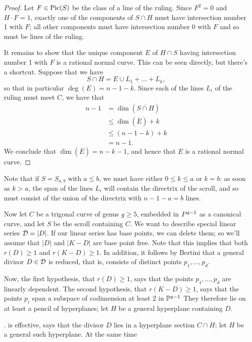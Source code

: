 \begin{proof}
Let $F \in \Pic(S)$ be the class of a line of the ruling. Since $F^2 = 0$ and $H\cdot F = 1$, exactly one of the components of $S \cap H$ must have intersection number 1 with $F$; all other components must have intersection number 0 with $F$ and so must be lines of the ruling.

It remains to show that the unique component $E$ of $H \cap S$ having intersection number 1 with $F$ is a rational normal curve. This can be seen directly, but there's a shortcut. Suppose that we have
$$
S \cap H = E \cup L_1 + \dots + L_k,
$$
so that in particular $\deg(E) = n-1-k$. Since each of the lines $L_i$ of the ruling must meet $C$, we have that
\begin{align*}
n-1 &= \dim(\overline{S \cap H}) \\
&\leq \dim(\overline {E}) + k\\
&\leq (n-1-k) + k \\
&= n-1.
\end{align*}
We conclude that $\dim(\overline E) = n-k-1$, and hence that $E$ is a rational normal curve.
\end{proof}

Note that if $S = S_{a,b}$ with $a \leq b$, we must have either $0 \leq k \leq a$ or $k = b$: as soon as $k > a$, the span of the lines $L_i$ will contain the directrix of the scroll, and so must consist of the union of the directrix with $n-1-a = b$ lines.

Now let $C$ be a trigonal curve of genus $g \geq 5$, embedded in $\\P^{g-1}$ as a canonical curve, and let $S$ be the scroll containing $C$. We want to describe special linear series $\cD = |D|$. If our linear series has base points, we can delete them; so we'll assume that $|D|$ and $|K-D|$ are base point free. Note that this implies that   both  $r(D) \geq 1$ and $r(K-D) \geq 1$. In addition, it follows by Bertini that a general divisor $D \in \cD$ is reduced, that is, consists of distinct points $p_1,\dots,p_d$.

Now, the first hypothesis, that $r(D) \geq 1$, says that the points $p_1,\dots,p_d$ are linearly dependent. The second hypothesis, that $r(K-D) \geq 1$, says that the points $p_i$ span a subspace of codimension at least 2 in $\PP^{g-1}$ They therefore lie on at least a pencil of hyperplanes; let $H$ be a general hyperplane containing $D$.




. is effective, says that the divisor $D$ lies in a hyperplane section $C \cap H$; let $H$ be a general such hyperplane. At the same time 

